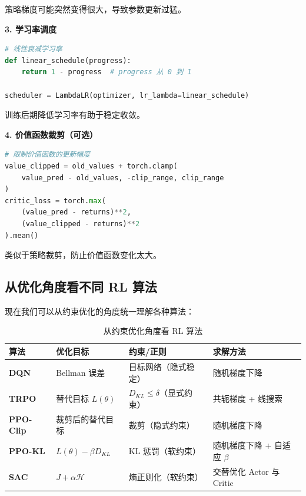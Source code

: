 策略梯度可能突然变得很大，导致参数更新过猛。

\textbf{3. 学习率调度}

\begin{lstlisting}[language=Python]
# 线性衰减学习率
def linear_schedule(progress):
    return 1 - progress  # progress 从 0 到 1

scheduler = LambdaLR(optimizer, lr_lambda=linear_schedule)
\end{lstlisting}

训练后期降低学习率有助于稳定收敛。

\textbf{4. 价值函数裁剪（可选）}

\begin{lstlisting}[language=Python]
# 限制价值函数的更新幅度
value_clipped = old_values + torch.clamp(
    value_pred - old_values, -clip_range, clip_range
)
critic_loss = torch.max(
    (value_pred - returns)**2,
    (value_clipped - returns)**2
).mean()
\end{lstlisting}

类似于策略裁剪，防止价值函数变化太大。

\subsection{从优化角度看不同 RL 算法}

现在我们可以从约束优化的角度统一理解各种算法：

\begin{table}[htbp]
\centering
\small
\renewcommand{\arraystretch}{1.5}
\caption{从约束优化角度看 RL 算法}
\begin{tabularx}{\textwidth}{p{1.8cm}|X|X|X}
\toprule
\textbf{算法} & \textbf{优化目标} & \textbf{约束/正则} & \textbf{求解方法} \\
\midrule
\textbf{DQN} & Bellman 误差 & 目标网络（隐式稳定） & 随机梯度下降 \\
\midrule
\textbf{TRPO} & 替代目标 $L(\theta)$ & $D_{KL} \leq \delta$（显式约束） & 共轭梯度 + 线搜索 \\
\midrule
\textbf{PPO-Clip} & 裁剪后的替代目标 & 裁剪（隐式约束） & 随机梯度下降 \\
\midrule
\textbf{PPO-KL} & $L(\theta) - \beta D_{KL}$ & KL 惩罚（软约束） & 随机梯度下降 + 自适应 $\beta$ \\
\midrule
\textbf{SAC} & $J + \alpha \mathcal{H}$ & 熵正则化（软约束） & 交替优化 Actor 与 Critic \\
\bottomrule
\end{tabularx}
\end{table}

